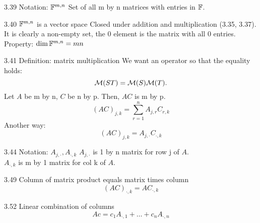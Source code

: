 \documentclass[12pt, letterpaper]{article}
\begin{document}
\begin{imp}
{3.39 Notation: $\mathbb{F}^{m,n}$}
Set of all m by n matrices with entries in $\mathbb{F}$.
\end{imp}

\begin{imp}
{3.40 $\mathbb{F}^{m,n}$ is a vector space}
Closed under addition and multiplication (3.35, 3.37). 
It is clearly a non-empty set, the 0 element is the matrix with all 0 entries.
\\Property: $\dim\mathbb{F}^{m,n}=mn$
\end{imp}

\begin{imp}
{3.41 Definition: matrix multiplication}
We want an operator so that the equality holds: $$\mathcal{M}(ST)=\mathcal{M}(S)\mathcal{M}(T).$$
Let $A$ be m by n, $C$ be n by p. Then, $AC$ is m by p.
$$(AC)_{j,k}=\sum_{r=1}^nA_{j,r}C_{r,k}$$
Another way:
$$(AC)_{j,k}=A_{j,\cdot}C_{\cdot,k}$$
\end{imp}

\begin{imp}
{3.44 Notation: $A_{j,\cdot},A_{\cdot,k}$}
$A_{j,\cdot}$ is 1 by n matrix for row j of $A$.\\
$A_{\cdot,k}$ is m by 1 matrix for col k of $A$.
\end{imp}

\begin{imp}
{3.49 Column of matrix product equals matrix times column}
$$(AC)_{\cdot,k}=AC_{\cdot,k}$$
\end{imp}

\begin{imp}
{3.52 Linear combination of columns}
$$Ac=c_1A_{\cdot,1}+\dots+c_nA_{\cdot,n}$$
\end{imp}
\end{document}

